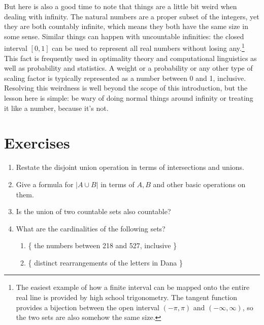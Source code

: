 \documentclass[a4paper,12pt,oneside,leqno]{scrartcl}%
\newcommand{\enquote}[1]{\frqq{}#1\flqq{}}
\theoremstyle{definition}
\begin{document}
But here is also a good time to note that things are a little bit weird when dealing with infinity.  The natural numbers are a proper subset of the integers, yet they are both countably infinite, which means they both have the same size in some sense. Similar things can happen with uncountable infinities: the closed interval $\left[0,1\right]$ can be used to represent all real numbers without \enquote{losing} any.\footnote{The easiest example of how a finite interval can be mapped onto the entire real line is provided by high school trigonometry.  The tangent function provides a bijection between the open interval $(-\pi,\pi)$ and $(-\infty, \infty)$, so the two sets are also somehow the same \enquote{size}.} This fact is frequently used in optimality theory and computational linguistics as well as probability and statistics.  A weight or a probability or any other type of scaling factor is typically represented as a number between 0 and 1, inclusive.  Resolving this weirdness is well beyond the scope of this introduction, but the lesson here is simple: be wary of doing \enquote{normal} things around infinity or treating it like a number, because it's not.

\section{Exercises}
\begin{enumerate}
\item Restate the disjoint union operation in terms of intersections and unions.
\item Give a formula for $|A \cup{} B|$ in terms of $A,B$ and other basic operations on them. 
\item Is the union of two countable sets also countable?
\item What are the cardinalities of the following sets?
	\begin{enumerate}
	\item \{ the numbers between 218 and 527, inclusive \}
	\item \{ distinct rearrangements of the letters in \enquote{Dana} \}
	\end{enumerate}
\end{enumerate}


%
\end{document}
